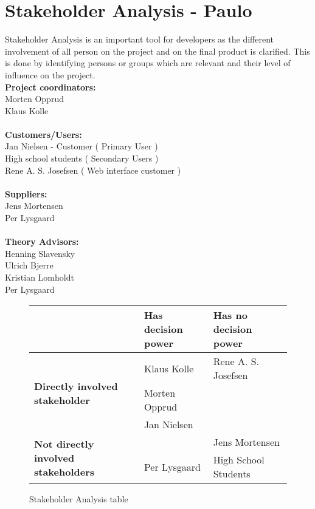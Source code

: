 \section{Stakeholder Analysis - Paulo}

Stakeholder Analysis is an important tool for developers as the different involvement of all person on the project and on the final product is clarified. This is done by identifying persons or groups which are relevant and their level of influence on the project.
\\[0.2cm]
\textbf{Project coordinators:}\\ Morten Opprud\\ Klaus Kolle\\
\\
\textbf{Customers/Users:}\\
Jan Nielsen - Customer ( Primary User )\\
High school students ( Secondary Users )\\
Rene A. S. Josefsen ( Web interface customer )\\
\\
\textbf{Suppliers:}\\
Jens Mortensen\\
Per Lysgaard\\
\\
\textbf{Theory Advisors:}\\
Henning Slavensky\\
Ulrich Bjerre\\
Kristian Lomholdt\\
Per Lysgaard\\

\begin{figure}[h!]
 \begin{center}
  \begin{tabular}{| l | l | l |}
   \hline
    & \textbf{Has decision power} & \textbf{Has no decision power} \\ \hline
    \multirow{3}{*}{\textbf{Directly involved stakeholder}} 
    	& Klaus Kolle & Rene A. S. Josefsen\\ 
    	& Morten Opprud &  \\ 
    	& Jan Nielsen &  \\ \hline
    \multirow{2}{*}{\textbf{Not directly involved stakeholders}} 
    	&  & Jens Mortensen\\
    	& Per Lysgaard & High School Students \\ \hline
   \end{tabular}
  \end{center}
 \caption{Stakeholder Analysis table}
\end{figure}

